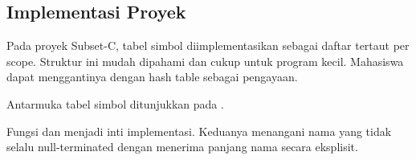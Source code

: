 \subsection{Implementasi Proyek}

Pada proyek Subset-C, tabel simbol diimplementasikan sebagai daftar
tertaut per scope. Struktur ini mudah dipahami dan cukup untuk
program kecil. Mahasiswa dapat menggantinya dengan hash table sebagai
pengayaan.

Antarmuka tabel simbol ditunjukkan pada .


Fungsi  dan  menjadi inti
implementasi. Keduanya menangani nama yang tidak selalu
null-terminated dengan menerima panjang nama secara eksplisit.
